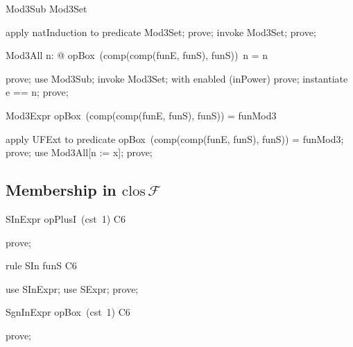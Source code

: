 \documentclass{article}
\begin{document}
\begin{theorem}{Mod3Sub}
  \nat \subseteq Mod3Set
\end{theorem}

\begin{zproof}
apply natInduction to predicate \nat \subseteq Mod3Set;
prove;
invoke Mod3Set;
prove;
\end{zproof}

\begin{theorem}{Mod3All}
  \forall n: \nat @ opBox~(comp(comp(funE, funS), funS))~n = n 
\end{theorem}

\begin{zproof}
prove;
use Mod3Sub;
invoke Mod3Set;
with enabled (inPower) prove;
instantiate e == n;
prove;
\end{zproof}

\begin{theorem}{Mod3Expr}
  opBox~(comp(comp(funE, funS), funS)) = funMod3
\end{theorem}

\begin{zproof}
apply UFExt to predicate opBox~(comp(comp(funE, funS), funS)) = funMod3;
prove;
use Mod3All[n := x];
prove;
\end{zproof}

\subsection{Membership in $\mathrm{clos}\,\mathcal{F}$}

\begin{theorem}{SInExpr}
  opPlusI~(cst~1) \in C6
\end{theorem}

\begin{zproof}
prove;
\end{zproof}

\begin{theorem}{rule SIn}
  funS \in C6
\end{theorem}

\begin{zproof}
use SInExpr;
use SExpr;
prove;
\end{zproof}

\begin{theorem}{SgnInExpr}
  opBox~(cst~1) \in C6
\end{theorem}

\begin{zproof}
prove;
\end{zproof}
\end{document}
